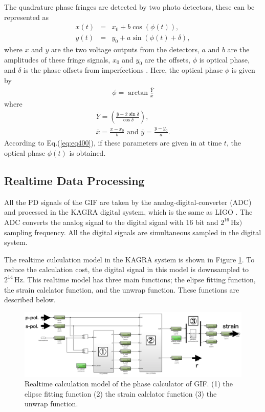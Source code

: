The quadrature phase fringes are detected by two photo detectors, these can be represented as 
\begin{eqnarray}
  x(t) &=& x_0 + b \cos(\phi(t)), \label{eq:eq450b} \\
  y(t) &=& y_0 + a \sin(\phi(t)+\delta), \label{eq:eq450a}  
\end{eqnarray}
where $x$ and $y$ are the two voltage outputs from the detectors, $a$ and $b$ are the amplitudes of these fringe signals, $x_0$ and $y_0$ are the offsets, $\phi$ is optical phase, and $\delta$ is the phase offsets from imperfections \cite{zumberge2004resolving}. Here, the optical phase $\phi$ is given by
\begin{eqnarray}
  \phi = \arctan {\frac{\bar{Y}}{\bar{x}}} \label{eq:eq440c}
\end{eqnarray}
where 
\begin{eqnarray}\label{eq:eq440a} 
  \bar{Y} = \left(\frac{\bar{y}-\bar{x}\sin{\delta}}{\cos{\delta}}\right), \\
  \bar{x} = \frac{x-x_0}{b}\,\,\mathrm{and}\,\,\bar{y} = \frac{y-y_0}{a}. \label{eq:eq440b}
\end{eqnarray}
According to Eq.(\ref{eq:eq400}), if these parameters are given in at time $t$, the optical phase $\phi(t)$ is obtained.


\subsection{Realtime Data Processing} \label{sec:142}
All the PD signals of the GIF are taken by the analog-digital-converter (ADC) and processed in the KAGRA digital system, which is the same as LIGO \cite{bork2001overview}. The ADC converts the analog signal to the digital signal with 16 bit and $2^{16}\,\mathrm{Hz})$ sampling frequency. All the digital signals are simultaneous sampled in the digital system. 

The realtime culculation model in the KAGRA system is shown in Figure  \ref{img:img420}. To reduce the calculation cost, the digital signal in this model is downsampled to $2^{14}\,\mathrm{Hz}$. This realtime model has three main functions; the elipse fitting function, the strain calclator function, and the unwrap function. These functions are described below.
\begin{figure}[h]
  \centering
  \includegraphics[width=15.0cm]{./img_chap4/img420.png}
  \caption{Realtime calculation model of the phase calculator of GIF. (1) the elipse fitting function (2) the strain calclator function (3) the unwrap function.}\label{img:img420}
\end{figure}

